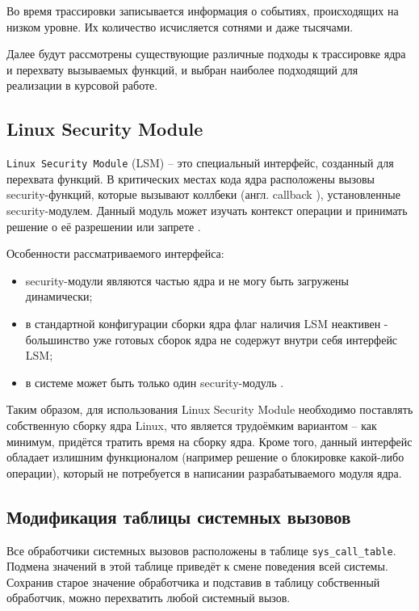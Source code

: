 Во время трассировки записывается информация о событиях, происходящих на низком уровне. Их количество исчисляется сотнями и даже тысячами. 

Далее будут рассмотрены существующие различные подходы к трассировке ядра и перехвату вызываемых функций, и выбран наиболее подходящий для реализации в курсовой работе.

\subsection{Linux Security Module}

\texttt{Linux Security Module} (LSM) \cite{linux-security-api} -- это специальный интерфейс, созданный для перехвата функций. В критических местах кода ядра расположены вызовы security-функций, которые вызывают коллбеки (англ. callback \cite{callback}), установленные security-модулем. Данный модуль может изучать контекст операции и принимать решение о её разрешении или запрете \cite{linux-security-api}.

Особенности рассматриваемого интерфейса:

\begin{itemize}
	\item security-модули являются частью ядра и не могу быть загружены динамически;
	\item в стандартной конфигурации сборки ядра флаг наличия LSM неактивен - большинство уже готовых сборок ядра не содержут внутри себя интерфейс LSM;
	\item в системе может быть только один security-модуль \cite{linux-security-api}.
\end{itemize}

Таким образом, для использования Linux Security Module необходимо поставлять собственную сборку ядра Linux, что является трудоёмким вариантом -- как минимум, придётся тратить время на сборку ядра. Кроме того, данный интерфейс обладает излишним функционалом (например решение о блокировке какой-либо операции), который не потребуется в написании разрабатываемого модуля ядра.

\subsection{Модификация таблицы системных вызовов}

Все обработчики системных вызовов расположены в таблице \texttt{sys\_call\_table}. Подмена значений в этой таблице приведёт к смене поведения всей системы. Сохранив старое значение обработчика и подставив в таблицу собственный обработчик, можно перехватить любой системный вызов.


